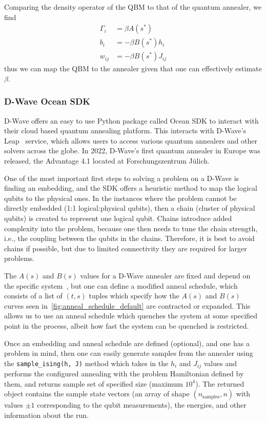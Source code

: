Comparing the density operator of the QBM to that of the quantum annealer, we find
\begin{align}
    \Gamma_i
        &= \beta A(s^*) \\
    b_i
        &= -\beta B(s^*) h_i \\
    w_{ij}
        &= -\beta B(s^*) J_{ij}
\end{align}
thus we can map the QBM to the annealer given that one can effectively estimate \( \beta \).

\subsubsection{D-Wave Ocean SDK}
D-Wave offers an easy to use Python package called Ocean SDK to interact with their cloud based quantum annealing platform.
This interacts with D-Wave's Leap~\cite{dwave_leap} service, which allows users to access various quantum annealers and other solvers across the globe.
In 2022, D-Wave's first quantum annealer in Europe was released, the Advantage 4.1 located at Forschungszentrum Jülich.

One of the most important first steps to solving a problem on a D-Wave is finding an embedding, and the SDK offers a heuristic method to map the logical qubits to the physical ones.
In the instances where the problem cannot be directly embedded (1:1 logical:physical qubits), then a chain (cluster of physical qubits) is created to represent one logical qubit.
Chains introduce added complexity into the problem, because one then needs to tune the chain strength, i.e., the coupling between the qubits in the chains.
Therefore, it is best to avoid chains if possible, but due to limited connectivity they are required for larger problems.

The \( A(s) \) and \( B(s) \) values for a D-Wave annealer are fixed and depend on the specific system~\cite{dwave_anneal_schedules}, but one can define a modified anneal schedule, which consists of a list of \( (t, s) \) tuples which specify how the \( A(s) \) and \( B(s) \) curves seen in~\cref{fig:anneal_schedule_default} are contracted or expanded.
This allows us to use an anneal schedule which quenches the system at some specified point in the process, albeit how fast the system can be quenched is restricted.

Once an embedding and anneal schedule are defined (optional), and one has a problem in mind, then one can easily generate samples from the annealer using the \texttt{sample\_ising(h, J)} method which takes in the \( h_i \) and \( J_{ij} \) values and performs the configured annealing with the problem Hamiltonian defined by them, and returns sample set of specified size (maximum \( 10^4 \)).
The returned object contains the sample state vectors (an array of shape \( (n_\text{samples}, n) \) with values \( \pm 1 \) corresponding to the qubit measurements), the energies, and other information about the run.

